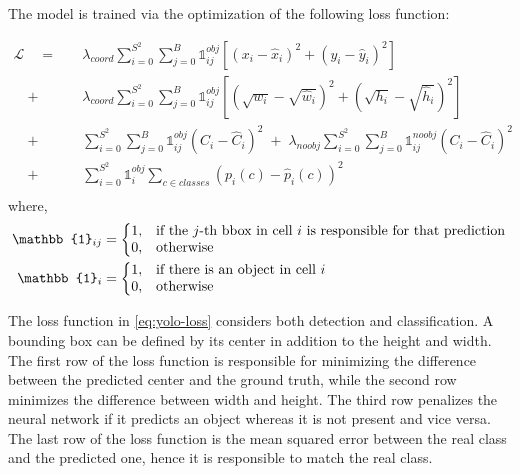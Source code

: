The model is trained via the optimization of the following loss function:

\begin{equation}\label{eq:yolo-loss}
    \begin{split}
        \mathcal{L} \quad =  \quad  &
            \lambda_{coord} \sum_{i=0}^{S^2} \sum_{j=0}^{B} \mathbb{1}_{ij}^{obj}
            [(x_i - \hat x_i)^2 + (y_i - \hat y_i)^2]\\
            \quad + \quad & \lambda_{coord} \sum_{i=0}^{S^2} \sum_{j=0}^{B} \mathbb{1}_{ij}^{obj}
                [(\sqrt{w_i} - \sqrt{\hat w_i})^2 + (\sqrt{h_i} - \sqrt{\hat h_i})^2]\\
            \quad + \quad & \sum_{i=0}^{S^2} \sum_{j=0}^{B} \mathbb{1}_{ij}^{obj}
                (C_i - \hat C_i)^2 \; + \; \lambda_{noobj} \sum_{i=0}^{S^2} \sum_{j=0}^{B} \mathbb{1}_{ij}^{noobj}(C_i - \hat C_i)^2\\
            \quad + \quad & \sum_{i=0}^{S^2} \mathbb{1}_{i}^{obj} \sum_{c \in classes}
                (p_i(c) - \hat p_i (c))^2\\
    \end{split}
\end{equation}
where,
\begin{align*}
    \mathbb{1}_{ij}&=\left\{
        \begin{array}{@{}ll@{}}
            1, & \text{if the } j \text{-th bbox in cell } i \text{ is responsible for that prediction}\\
            0, & \text{otherwise}
        \end{array}\right.\\
    \mathbb{1}_{i}&=\left\{
        \begin{array}{@{}ll@{}}
            1, & \text{if there is an object in cell}\ i \\
            0, & \text{otherwise}
        \end{array}\right.
\end{align*}


The loss function in \autoref{eq:yolo-loss} considers both detection and classification. A bounding box can be defined by its center in addition to the height and width. The first row of the loss function is responsible for minimizing the difference between the predicted center and the ground truth, while the second row minimizes the difference between width and height.
The third row penalizes the neural network if it predicts an object whereas it is not present and vice versa. The last row of the loss function is the mean squared error between the real class and the predicted one, hence it is responsible to match the real class.

